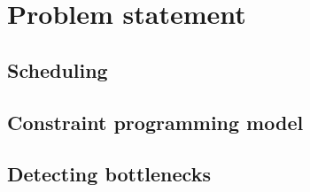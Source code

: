 \chapter{Problem statement}

\section{Scheduling}

\section{Constraint programming model}

\section{Detecting bottlenecks}
